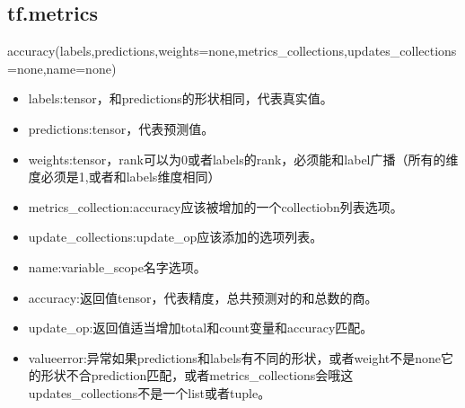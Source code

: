 \subsection{tf.metrics}
accuracy(labels,predictions,weights=none,metrics\_collections,updates\_collections=none,name=none)
\begin{itemize}
	\item labels:tensor，和predictions的形状相同，代表真实值。
	\item predictions:tensor，代表预测值。
	\item weights:tensor，rank可以为0或者labels的rank，必须能和label广播（所有的维度必须是1,或者和labels维度相同）
	\item metrics\_collection:accuracy应该被增加的一个collectiobn列表选项。
	\item update\_collections:update\_op应该添加的选项列表。
	\item name:variable\_scope名字选项。
	\item accuracy:返回值tensor，代表精度，总共预测对的和总数的商。
	\item update\_op:返回值适当增加total和count变量和accuracy匹配。
	\item valueerror:异常如果predictions和labels有不同的形状，或者weight不是none它的形状不合prediction匹配，或者metrics\_collections会哦这updates\_collections不是一个list或者tuple。
\end{itemize}
